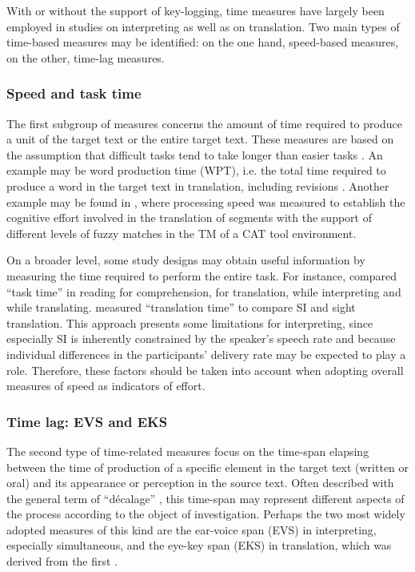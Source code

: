 With or without the support of key-logging, time measures have largely been employed in studies on interpreting as well as on translation. Two main types of time-based measures may be identified: on the one hand, speed-based measures, on the other, time-lag measures.
\subsubsection{Speed and task time} \label{speed}
The first subgroup of measures concerns the amount of time required to produce a unit of the target text or the entire target text. These measures are based on the assumption that difficult tasks tend to take longer than easier tasks \citep[87]{obrien_processing_2008}. An example may be word production time (WPT), i.e. the total time required to produce a word in the target text in translation, including revisions \citep[3]{carl_measuring_2016}. Another example may be found in \citet{obrien_processing_2008}, where processing speed was measured to establish the cognitive effort involved in the translation of segments with the support of different levels of fuzzy matches in the TM of a CAT tool environment.









On a broader level, some study designs may obtain useful information by measuring the time required to perform the entire task. For instance, \citet{jakobsen_eye_2008} compared ``task time'' in reading for comprehension, for translation, while interpreting and while translating. \citet{chmiel_eye_2020} measured ``translation time'' to compare SI and sight translation. This approach presents some limitations for interpreting, since especially SI is inherently constrained by the speaker's speech rate and because individual differences in the participants' delivery rate may be expected to play a role. Therefore, these factors should be taken into account when adopting overall measures of speed as indicators of effort.


\subsubsection{Time lag: EVS and EKS} \label{EVS_EKS}
The second type of time-related measures focus on the time-span elapsing between the time of production of a specific element in the target text (written or oral) and its appearance or perception in the source text. Often described with the general term of ``décalage'' \citep[418]{timarova_time_2015}, this time-span may represent different aspects of the process according to the object of investigation. Perhaps the two most widely adopted measures of this kind are the ear-voice span (EVS) in interpreting, especially simultaneous, and the eye-key span (EKS) in translation, which was derived from the first \citep{dragsted_comprehension_2008}.

